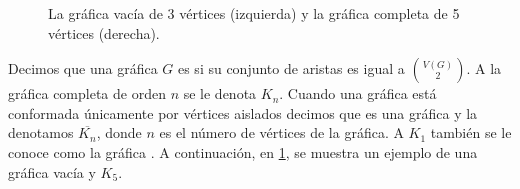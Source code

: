\begin{figure}[ht!]
    \centering
        \caption{La gr\'afica vac\'ia de 3 v\'ertices (izquierda) y la
        gr\'afica completa de 5 v\'ertices (derecha).}
        \label{fig:ex-va-comp}
    \end{figure}

Decimos que una gr\'afica $G$ es  si su conjunto
de aristas es igual a $\binom{V(G)}{2}$. A la gr\'afica completa de orden $n$ se
le denota $K_n$. Cuando una gr\'afica est\'a conformada \'unicamente por
v\'ertices aislados decimos que es una gr\'afica 
y la denotamos $\overline{K_n}$, donde $n$ es el n\'umero de v\'ertices de la
gr\'afica. A $K_1$ tambi\'en se le conoce como la gr\'afica  . A
continuaci\'on, en \cref{fig:ex-va-comp}, se muestra un ejemplo de una gr\'afica
vac\'ia y $K_5$.

